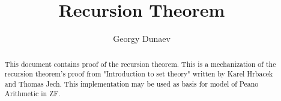 \documentclass[11pt,a4paper]{article}
\begin{document}
\title{Recursion Theorem}
\author{Georgy Dunaev}
\maketitle

\begin{abstract}
  This document contains proof of the recursion theorem.
  This is a mechanization of the recursion theorem's proof from 
  "Introduction to set theory" written by Karel Hrbacek 
  and Thomas Jech. This implementation may be used as basis for 
  model of Peano Arithmetic in ZF.
\end{abstract}

\tableofcontents





\end{document}
